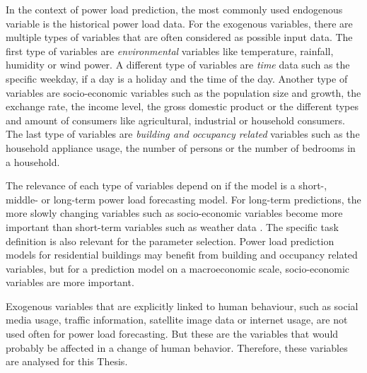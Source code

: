 In the context of power load prediction, the most commonly 
used endogenous variable is the historical power load data.
For the exogenous variables, there are multiple types of 
variables that are often considered as possible input data.
The first type of variables are \textit{environmental} variables like temperature, 
rainfall, humidity or wind power. A different type of variables are \textit{time} data
such as the specific weekday, if a day is a holiday and the time of the day.
Another type of variables are socio-economic variables such as the
population size and growth, the exchange rate, the income level,
the gross domestic product or the different types and amount 
of consumers like agricultural, industrial or household consumers.
The last type of variables are \textit{building and occupancy related} variables such
as the household appliance usage,
the number of persons or the number of bedrooms in a household.

The relevance of each type of variables depend on if the model is
a short-, middle- or long-term power load forecasting model. For 
long-term predictions, the more slowly changing variables such as socio-economic
variables become more important than short-term variables such as weather data 
\cite{loadforecastingtimedependency2}\cite{loadforecastingtimedependency}.
The specific task definition is also relevant for the parameter selection.
Power load prediction models for residential buildings may benefit from 
building and occupancy related variables, but for a prediction model on a 
macroeconomic scale, socio-economic variables are more important.

Exogenous variables that are explicitly linked to human behaviour, 
such as social media usage, traffic information, satellite image data or 
internet usage, are not used often for power load forecasting. 
But these are the variables that would probably be affected in a change of 
human behavior. Therefore, these variables are analysed for this Thesis.

